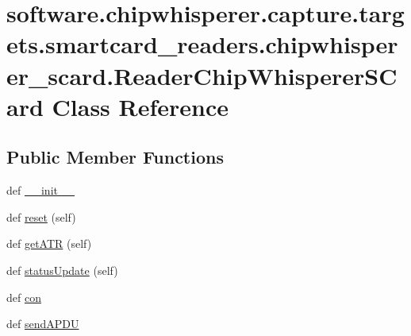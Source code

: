 \hypertarget{classsoftware_1_1chipwhisperer_1_1capture_1_1targets_1_1smartcard__readers_1_1chipwhisperer__scard_1_1ReaderChipWhispererSCard}{}\section{software.\+chipwhisperer.\+capture.\+targets.\+smartcard\+\_\+readers.\+chipwhisperer\+\_\+scard.\+Reader\+Chip\+Whisperer\+S\+Card Class Reference}
\label{classsoftware_1_1chipwhisperer_1_1capture_1_1targets_1_1smartcard__readers_1_1chipwhisperer__scard_1_1ReaderChipWhispererSCard}
\subsection*{Public Member Functions}
\begin{DoxyCompactItemize}
\item 
def \hyperlink{classsoftware_1_1chipwhisperer_1_1capture_1_1targets_1_1smartcard__readers_1_1chipwhisperer__scard_1_1ReaderChipWhispererSCard_a1367b3e288770a9faa44a55d81e46743}{\+\_\+\+\_\+init\+\_\+\+\_\+}
\item 
def \hyperlink{classsoftware_1_1chipwhisperer_1_1capture_1_1targets_1_1smartcard__readers_1_1chipwhisperer__scard_1_1ReaderChipWhispererSCard_a494c9fc0fb5df8dc845b648765845e1a}{reset} (self)
\item 
def \hyperlink{classsoftware_1_1chipwhisperer_1_1capture_1_1targets_1_1smartcard__readers_1_1chipwhisperer__scard_1_1ReaderChipWhispererSCard_a9efe2c713fee14b47b8cdf20bfead21d}{get\+A\+T\+R} (self)
\item 
def \hyperlink{classsoftware_1_1chipwhisperer_1_1capture_1_1targets_1_1smartcard__readers_1_1chipwhisperer__scard_1_1ReaderChipWhispererSCard_ab3dafd296b8e707dc77a5d83fa681d70}{status\+Update} (self)
\item 
def \hyperlink{classsoftware_1_1chipwhisperer_1_1capture_1_1targets_1_1smartcard__readers_1_1chipwhisperer__scard_1_1ReaderChipWhispererSCard_a73a6c8f5db4f5f4f7eaf80925956f86a}{con}
\item 
def \hyperlink{classsoftware_1_1chipwhisperer_1_1capture_1_1targets_1_1smartcard__readers_1_1chipwhisperer__scard_1_1ReaderChipWhispererSCard_a1474242e470d5cc643d5e929e945d429}{send\+A\+P\+D\+U}
\end{DoxyCompactItemize}
